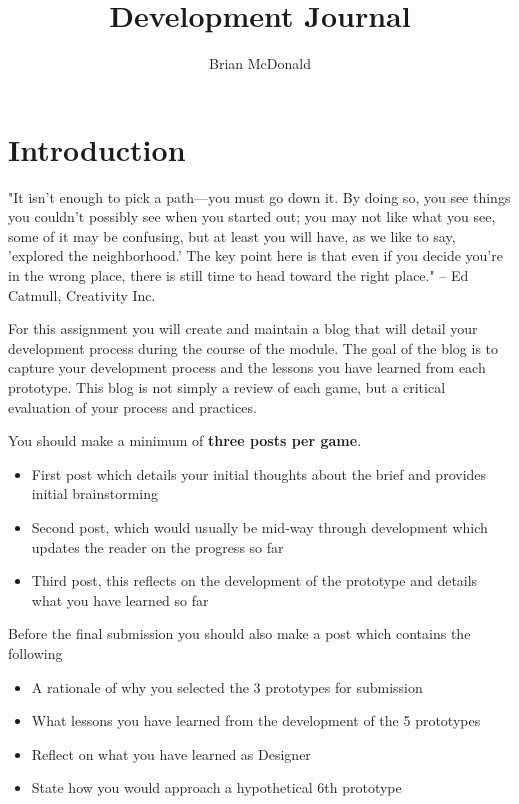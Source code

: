\documentclass{../../fal_assignment}
\title{Development Journal}
\author{Brian McDonald}
\begin{document}
\maketitle

\section*{Introduction}

\begin{marginquote}
"It isn't enough to pick a path—you must go down it. By doing so, you see things you couldn't possibly see when you started out; you may not like what you see, some of it may be confusing, but at least you will have, as we like to say, 'explored the neighborhood.' The key point here is that even if you decide you're in the wrong place, there is still time to head toward the right place."
-- Ed Catmull, Creativity Inc.

\end{marginquote}

For this assignment you will create and maintain a blog that will detail your development process during the course of the module. The goal of the blog is to capture your development process and the lessons you have learned from each prototype. This blog is not simply a review of each game, but a critical evaluation of your process and practices.

You should make a minimum of \textbf{three posts per game}.

\begin{itemize}
	\item First post which details your initial thoughts about the brief and provides initial brainstorming
	\item Second post, which would usually be mid-way through development which updates the reader on the progress so far
	\item Third post, this reflects on the development of the prototype and details what you have learned so far
\end{itemize}

Before the final submission you should also make a post which contains the following

\begin{itemize}
	\item A rationale of why you selected the 3 prototypes for submission
	\item What lessons you have learned from the development of the 5 prototypes
	\item Reflect on what you have learned as Designer
	\item State how you would approach a hypothetical 6th prototype 
\end{itemize}
\end{document}
